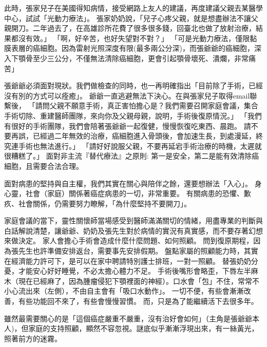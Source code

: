 \documentclass[12pt, a4paper]{article}
\begin{document}
此時，張家兒子在美國得知病情，接受網路上友人的建議，再度建議父親去某醫學中心，試試「光動力療法」。
張家奶奶說，「兒子心疼父親，就是想盡辦法不讓父親開刀。二年過去了，在高雄診所花費了很多很多錢，回臺北也做了放射治療，結果都沒有效。」
「啊，好辛苦，也好失望對不對？」
「可是光動力療法，僅限黏膜表層的癌細胞。因為雷射光照深度有限(最多兩公分深)，而張爺爺的癌細胞，深入下顎骨至少三公分，不僅無法清除癌細胞，更會引起顎骨壞死、潰爛，非常痛苦」




張爺爺必須面對現狀。我們做檢查的同時，也一再明確指出「目前除了手術，已經沒有別的方式可以痊癒」。
爺爺一直逃避無法下決心。在與張家兒子取得email聯繫後，
「請問父親不願意手術，真正害怕擔心是？我們需要召開家庭會議，集合手術切除、重建醫師團隊，來向你及父親母親，說明，手術後復原情況。」
「我們有很好的手術團隊，我們會陪著張爺爺一起復健，慢慢恢復吃東西、晨跑。
請不要再誤，已經過二年無效的治療，癌細胞進入骨頭後，會加速生長，到處漫延，終究連手術也無法進行。」
「請好好說服父親，不要再延宕手術治療的時機，太遲就很糟糕了。」
面對非主流『替代療法』之原則:
第一是安全，第二是能有效清除癌細胞，且需要合法合理。

面對病患的堅持與自主權，我們其實在關心與陪伴之餘，還要想辦法「入心」。
身心靈，社會（家庭）關係著癌症病患的一切，非常重要。
有關病患的恐懼、歉疚、社會關係，仍需要努力瞭解，「為什麼堅持不要開刀」。


家庭會議的當下，靈性關懷師當場感受到醫師滿滿關切的情緒，用盡專業的判斷與白話解說清楚，讓爺爺、奶奶及張先生對於病情的實況有真實感，而不要存著幻想來做決定。
家人會擔心手術會造成什麼什麼問題、如何照顧。
問到復原期程，因為張先生也許準備安排返台，需要事先安排假期。
盤點家屬的照顧能力時，其實在經濟能力許可下，是可以在家中聘請特別護士排班，一對一照顧。
替張奶奶分憂，才能安心好好睡覺，不必太擔心體力不足。
手術後嘴形會略歪，下唇左半麻木（現在已經麻了，因為腫瘤侵犯下顎裡面的神經）。口水會「包」不住，常常不小心流出來（左側），不由自主會有「吸口水動作」。
一切不便，有些會漸漸改善，有些功能回不來了，有些會慢慢習慣。
而，只是為了能繼續活下去很多年。

雖然最需要關心的是「這個癌症嚴重不嚴重，沒有治好會如何」（主角是張爺爺本人)，但家庭的支持照顧，顯然不容忽視。謎底似乎漸漸浮現出來，有一絲黃光，照著前方的迷霧。
\end{document}
